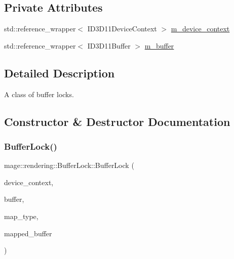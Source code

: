\subsection*{Private Attributes}
\begin{DoxyCompactItemize}
\item 
std\+::reference\+\_\+wrapper$<$ I\+D3\+D11\+Device\+Context $>$ \mbox{\hyperlink{classmage_1_1rendering_1_1_buffer_lock_afa41d2028ffcffd11f7e17ae505d1e93}{m\+\_\+device\+\_\+context}}
\item 
std\+::reference\+\_\+wrapper$<$ I\+D3\+D11\+Buffer $>$ \mbox{\hyperlink{classmage_1_1rendering_1_1_buffer_lock_ae3e40fcda48227f62eb63611cad1a507}{m\+\_\+buffer}}
\end{DoxyCompactItemize}


\subsection{Detailed Description}
A class of buffer locks. 

\subsection{Constructor \& Destructor Documentation}
\mbox{\label{classmage_1_1rendering_1_1_buffer_lock_a548c15e53e0903471268c83f16126f43}} 
\subsubsection{\texorpdfstring{Buffer\+Lock()}{BufferLock()}\hspace{0.1cm}{\footnotesize\ttfamily [1/3]}}
{\footnotesize\ttfamily mage\+::rendering\+::\+Buffer\+Lock\+::\+Buffer\+Lock (\begin{DoxyParamCaption}\item[{I\+D3\+D11\+Device\+Context \&}]{device\+\_\+context,  }\item[{I\+D3\+D11\+Buffer \&}]{buffer,  }\item[{D3\+D11\+\_\+\+M\+AP}]{map\+\_\+type,  }\item[{D3\+D11\+\_\+\+M\+A\+P\+P\+E\+D\+\_\+\+S\+U\+B\+R\+E\+S\+O\+U\+R\+CE \&}]{mapped\+\_\+buffer }\end{DoxyParamCaption})\hspace{0.3cm}{\ttfamily [explicit]}}

